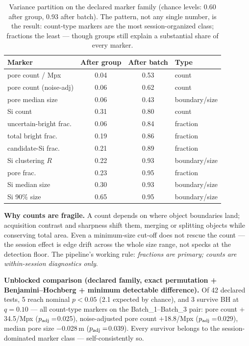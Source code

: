 \documentclass[10pt,a4paper]{article}
\begin{document}
\begin{table}[H]\centering\small
\caption{Variance partition on the declared marker family (chance levels:
0.60 after group, 0.93 after batch). The pattern, not any single number,
is the result: count-type markers are the most session-organized class;
fractions the least --- though groups still explain a substantial share
of every marker.}
\begin{tabular}{l c c l}
\toprule
Marker & After group & After batch & Type \\
\midrule
pore count / Mpx & 0.04 & 0.53 & count \\
pore count (noise-adj) & 0.06 & 0.62 & count \\
pore median size & 0.06 & 0.43 & boundary/size \\
Si count & 0.31 & 0.80 & count \\
uncertain-bright frac. & 0.06 & 0.84 & fraction \\
total bright frac. & 0.19 & 0.86 & fraction \\
candidate-Si frac. & 0.21 & 0.89 & fraction \\
Si clustering $R$ & 0.22 & 0.93 & boundary/size \\
pore frac. & 0.23 & 0.95 & fraction \\
Si median size & 0.30 & 0.93 & boundary/size \\
Si 90\% size & 0.65 & 0.95 & boundary/size \\
\bottomrule
\end{tabular}
\end{table}

\textbf{Why counts are fragile.} A count depends on where object
boundaries land; acquisition contrast and sharpness shift them, merging
or splitting objects while conserving total area. Even a minimum-size
cut-off does not rescue the count --- the session effect is edge drift
across the whole size range, not specks at the detection floor. The
pipeline's working rule: \emph{fractions are primary; counts are
within-session diagnostics only}.

\textbf{Unblocked comparison (declared family, exact permutation +
Benjamini--Hochberg + minimum detectable difference).} Of
42 declared tests,
5 reach nominal $p<0.05$
(2.1 expected by
chance), and 3 survive
BH at $q=0.10$ --- all count-type markers on the Batch\_1--Batch\_3
pair: pore count $+$34.5/Mpx
($p_{\rm adj}=$0.025),
noise-adjusted pore count $+$18.8/Mpx
($p_{\rm adj}=$0.029),
median pore size $-$0.028\,\textmu m
($p_{\rm adj}=$0.039).
Every survivor belongs to the session-dominated marker class ---
self-consistently so.
\end{document}

